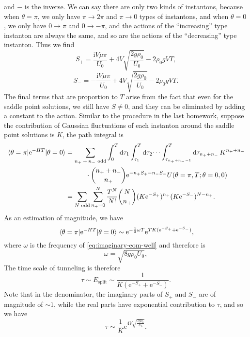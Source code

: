 \documentclass[hyperref, a4paper]{article}
\newcommand*{\ii}{\mathrm{i}}
\newcommand*{\ee}{\mathrm{e}}
\begin{document}
\begin{itemize}
and $-$ is the inverse.
We can say there are only two kinds of instantons,
because when $\theta = \pi$,
we only have $\pi \to 2\pi$ and $\pi \to 0$ types of instantons,
and when $\theta = 0$,
we only have $0 \to \pi$ and $0 \to - \pi$,
and the actions of the ``increasing'' type instanton are always the same,
and so are the actions of the ``decreasing'' type instanton.
Thus we find 
\begin{equation}
    S_+ = \frac{\ii V \mu \pi}{U_0} + 4 V \sqrt{\frac{2 g \rho_0}{U_0}} - 2 \rho_0 g V T,
\end{equation}
\begin{equation}
    S_- = - \frac{\ii V \mu \pi}{U_0} + 4 V \sqrt{\frac{2 g \rho_0}{U_0}} - 2 \rho_0 g V T.
\end{equation}
The final terms that are proportion to $T$
arise from the fact that even for the saddle point solutions,
we still have $S \neq 0$,
and they can be eliminated by adding a constant to the action.
Similar to the procedure in the last homework,
suppose the contribution of Gaussian fluctuations of each instanton around the saddle point solutions is $K$,
the path integral is 
\begin{equation}
    \begin{aligned}
        \mel{\theta = \pi}{\ee^{- H T}}{\theta = 0} &= \sum_{\text{$n_+ + n_-$ odd}}
        \int_0^{T} \dd{\tau_1} \int_{\tau_1}^{T} \dd{\tau_2} \dots \int_{\tau_{n_+ + n_- - 1}}^T 
        \dd{\tau_{n_+ + n_-}} K^{n_+ + n_-}  \\
        &\quad \quad \quad \cdot \binom{n_+ + n_-}{n_+} \ee^{- n_+ S_+ - n_- S_-} U(\theta = \pi, T; \theta = 0, 0) \\
        &= \sum_{\text{$N$ odd}} \sum_{n_+ = 0}^N \frac{T^N}{N!} 
        \binom{N}{n_+} (K \ee^{- S_+})^{n_+} (K \ee^{- S_-})^{N - n_+}.
    \end{aligned}
\end{equation}
As an estimation of magnitude,
we have 
\begin{equation}
    \mel{\theta = \pi}{\ee^{- H T}}{\theta = 0} 
    \sim \ee^{- \frac{1}{2} \omega T} \ee^{TK(\ee^{- S_+} + \ee^{- S_-})},
\end{equation}
where $\omega$ is the frequency of \eqref{eq:imaginary-eom-well} and therefore is 
\begin{equation}
    \omega = \sqrt{ 8 g \rho_0 U_0 },
\end{equation}
The time scale of tunneling is therefore 
\begin{equation}
    \tau \sim E_{\text{split}} \sim \frac{1}{K(\ee^{- S_+} + \ee^{- S_-})}. 
\end{equation}
Note that in the denominator, 
the imaginary parts of $S_+$ and $S_-$ are of magnitude of $\sim 1$,
while the real parts have exponential contribution to $\tau$,
and so we have 
\begin{equation}
    \tau \sim \frac{1}{K} \ee^{4 V \sqrt{\frac{2 g \rho_0}{U_0}}}.
\end{equation}

\end{itemize}
\end{document}
